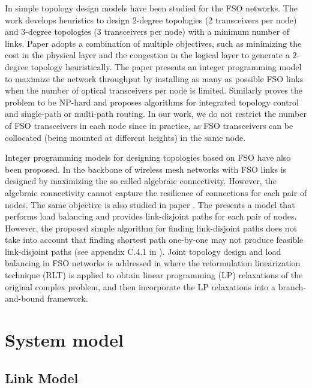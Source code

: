 \documentclass[onecolumn,11pt,draftclsnofoot]{IEEEtran}
\begin{document}
In \cite{Llorca2004, Zhuang2004, Cao2008} simple topology design models have been studied for the FSO networks. The work \cite{Llorca2004} develops heuristics to design $2$-degree topologies ($2$ transceivers per node) and $3$-degree topologies ($3$ transceivers per node) with a minimum number of links. Paper \cite{Zhuang2004} adopts a combination of multiple objectives, such as minimizing the cost in the physical layer and the congestion in the logical layer to generate a $2$-degree topology heuristically. The paper \cite{Cao2008} presents an integer programming model to maximize the network throughput by installing as many as possible FSO links when the number of optical transceivers per node is limited. Similarly \cite{Abhish2007} proves the problem to be NP-hard and proposes algorithms for integrated topology control
and single-path or multi-path routing. In our work, we do not restrict the number of FSO transceivers in each node since in practice, as FSO transceivers can be collocated (being mounted at different heights) in the same node.

Integer programming models for designing topologies based on FSO have also been proposed. In \cite{Son2010} the backbone of wireless mesh networks with FSO links is designed by maximizing the so called algebraic connectivity. However, the algebraic connectivity cannot capture the resilience of connections for each pair of nodes.  The same objective is also studied in paper \cite{Zhou2013}.
The \cite{Ouveysi2010} presents a model that performs load balancing and provides link-disjoint paths for each pair of nodes. However, the proposed simple algorithm for finding link-disjoint paths does not take into account that finding shortest path one-by-one may not produce feasible link-disjoint paths (see appendix C.4.1 in \cite{pioro2004}).
Joint topology design and load balancing in FSO networks is addressed in \cite{Son2014} where the reformulation linearization technique (RLT) is applied to obtain linear programming (LP) relaxations of the original complex problem, and then incorporate the LP relaxations into a branch-and-bound framework.


\section{System model}\label{sec:system}

\subsection{Link Model}
\end{document}
